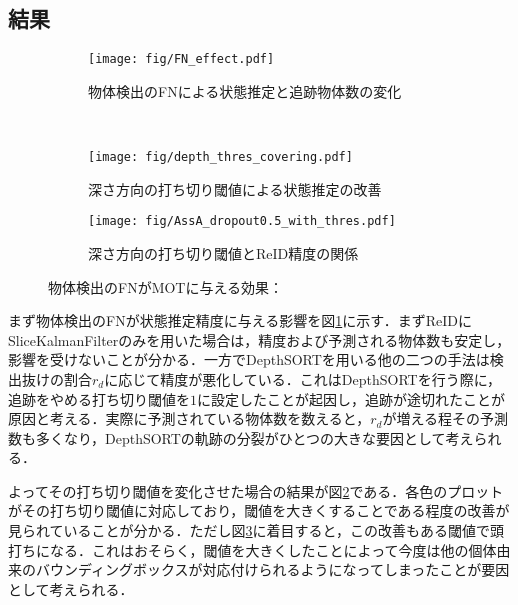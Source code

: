     \subsection{結果}

    \begin{figure}[t]
        \centering
        \begin{subfigure}[b]{\linewidth}
            \centering
            \texttt{[image: fig/FN\_effect.pdf]}
            \caption[物体検出のFNによる状態推定と追跡物体数の変化]{物体検出のFNによる状態推定と追跡物体数の変化}
            \label{fig:FN_effect}
        \end{subfigure}
        \\
        \begin{subfigure}[t]{0.6\linewidth}
            \centering
            \texttt{[image: fig/depth\_thres\_covering.pdf]}
            \caption[深さ方向の打ち切り閾値による状態推定の改善]{深さ方向の打ち切り閾値による状態推定の改善}
            \label{fig:depth_thres_covering}
        \end{subfigure}
        \hfill
        \begin{subfigure}[t]{0.3\linewidth}
            \centering
            \texttt{[image: fig/AssA\_dropout0.5\_with\_thres.pdf]}
            \caption[深さ方向の打ち切り閾値とReID精度の関係]{深さ方向の打ち切り閾値とReID精度の関係}
            \label{fig:AssA_with_thres}
        \end{subfigure}
        \caption[物体検出のFNがMOTに与える効果]{物体検出のFNがMOTに与える効果：}
        \label{fig:MOT_detectionFN}
    \end{figure}

    まず物体検出のFNが状態推定精度に与える影響を図\ref{fig:FN_effect}に示す．まずReIDにSliceKalmanFilterのみを用いた場合は，精度および予測される物体数も安定し，影響を受けないことが分かる．一方でDepthSORTを用いる他の二つの手法は検出抜けの割合$r_d$に応じて精度が悪化している．これはDepthSORTを行う際に，追跡をやめる打ち切り閾値を$1$に設定したことが起因し，追跡が途切れたことが原因と考える．実際に予測されている物体数を数えると，$r_d$が増える程その予測数も多くなり，DepthSORTの軌跡の分裂がひとつの大きな要因として考えられる．

    よってその打ち切り閾値を変化させた場合の結果が図\ref{fig:depth_thres_covering}である．各色のプロットがその打ち切り閾値に対応しており，閾値を大きくすることである程度の改善が見られていることが分かる．ただし図\ref{fig:AssA_with_thres}に着目すると，この改善もある閾値で頭打ちになる．これはおそらく，閾値を大きくしたことによって今度は他の個体由来のバウンディングボックスが対応付けられるようになってしまったことが要因として考えられる．